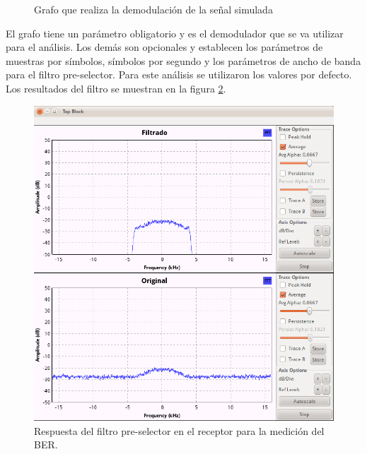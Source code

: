 \begin{figure}[htp]
  \centering
  \vspace{0.3in}
  \vspace{0.3in}
  \caption{Grafo que realiza la demodulaci\'on de la se\~nal simulada}
  \label{fig:analizer}
\end{figure}

El grafo tiene un par\'ametro obligatorio y es el demodulador que se va utilizar para el an\'alisis.
Los dem\'as son opcionales y establecen los par\'ametros de muestras por s\'imbolos, s\'imbolos
por segundo y los par\'ametros de ancho de banda para el filtro pre-selector. Para este an\'alisis
se utilizaron los valores por defecto. Los resultados del filtro se muestran en la figura
\ref{fig:predetect}.

\begin{figure}[htp]
  \centering
  \includegraphics[scale=0.5]{figs/predetectfilter}
  \vspace{0.3in}
  \caption{Respuesta del filtro pre-selector en el receptor para la medici\'on del BER.}
  \label{fig:predetect}
\end{figure}

